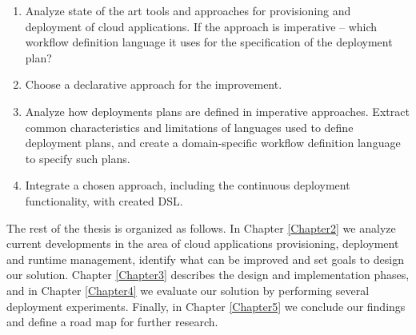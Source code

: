 \begin{enumerate}
\item  Analyze state of the art tools and approaches for provisioning and deployment of cloud applications. If the approach is imperative -- which workflow definition language it uses for the specification of the deployment plan?

\item  Choose a declarative approach for the improvement.

\item  Analyze how deployments plans are defined in imperative approaches. Extract common characteristics and limitations of languages used to define deployment plans, and create a domain-specific workflow definition language to specify such plans.

\item  Integrate a chosen approach, including the continuous deployment functionality, with created DSL.

\end{enumerate}

\noindent The rest of the thesis is organized as follows. In Chapter \ref{Chapter2} we analyze current developments in the area of cloud applications provisioning, deployment and runtime management, identify what can be improved and set goals to design our solution. Chapter \ref{Chapter3} describes the design and implementation phases, and in Chapter \ref{Chapter4} we evaluate our solution by performing several deployment experiments. Finally, in Chapter \ref{Chapter5} we conclude our findings and define a road map for further research.

